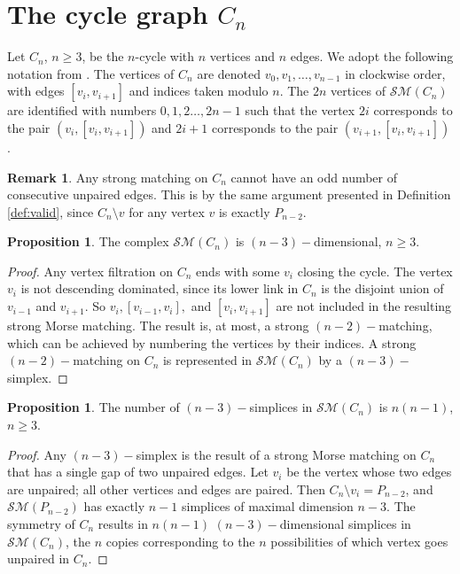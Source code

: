 \documentclass{amsart}
\theoremstyle{definition}
\newtheorem{proposition}[theorem]{Proposition}
\newtheorem{remark}[theorem]{Remark}
\newcommand{\sm}{{\mathcal{SM}}}
\begin{document}
\section{The cycle graph $C_n$}\label{sec:cycle}
Let $C_n$, $n\ge 3$, be the $n$-cycle with $n$ vertices and $n$ edges. We adopt the following notation from \cite{ChariJoswig2005}. The vertices of $C_n$ are denoted $v_0,v_1,\dots,v_{n-1}$ in clockwise order, with edges $[v_i,v_{i+1}]$ and indices taken modulo $n$. The $2n$ vertices of $\mathcal{SM}(C_n)$ are identified with numbers $0,1,2\dots,2n-1$ such that the vertex $2i$ corresponds to the pair $(v_i,[v_i,v_{i+1}])$ and $2i+1$ corresponds to the pair $(v_{i+1},[v_i,v_{i+1}])$.

\begin{remark}
    Any strong matching on $C_n$ cannot have an odd number of consecutive unpaired edges. This is by the same argument presented in Definition \ref{def:valid}, since $C_n\setminus v$ for any vertex $v$ is exactly $P_{n-2}$.
\end{remark}

\begin{proposition}
    The complex $\mathcal{SM}(C_n)$ is $(n-3)-$dimensional, $n\geq 3.$
\end{proposition}

\begin{proof}
    Any vertex filtration on $C_n$ ends with some $v_i$ closing the cycle. The vertex $v_i$ is not descending dominated, since its lower link in $C_n$ is the disjoint union of $v_{i-1}$ and $v_{i+1}$. So $v_i,[v_{i-1},v_i],$ and $[v_i,v_{i+1}]$ are not included in the resulting strong Morse matching. The result is, at most, a strong $(n-2)-$matching, which can be achieved by numbering the vertices by their indices. A strong $(n-2)-$matching on $C_n$ is represented in $\mathcal{SM}(C_n)$ by a $(n-3)-$simplex.
\end{proof}

\begin{proposition}
    The number of $(n-3)-$simplices in $\mathcal{SM}(C_n)$ is $n(n-1)$, $n\geq 3$.
\end{proposition} 

\begin{proof}
    Any $(n-3)-$simplex is the result of a strong Morse matching on $C_n$ that has a single gap of two unpaired edges. Let $v_{i}$ be the vertex whose two edges are unpaired; all other vertices and edges are paired. Then $C_n\setminus v_{i}=P_{n-2}$, and $\sm(P_{n-2})$ has exactly $n-1$ simplices of maximal dimension $n-3$. The symmetry of $C_n$ results in $n(n-1)$ $(n-3)-$dimensional simplices in $\sm(C_n)$, the $n$ copies  corresponding to the $n$ possibilities of which vertex goes unpaired in $C_n$.
\end{proof}
\end{document}
